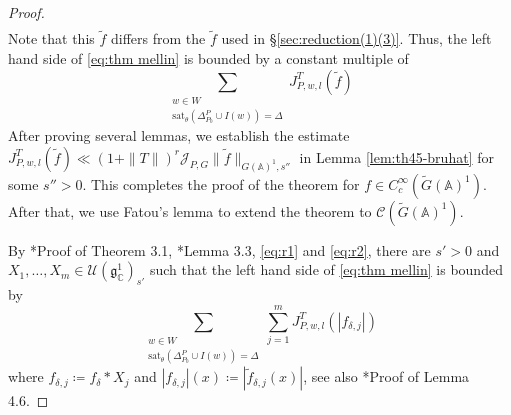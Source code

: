 \documentclass[12pt]{amsart}
\theoremstyle{definition}
\theoremstyle{plain}
\theoremstyle{remark}
\def\C{\mathbb{C}}%
\def\A{\mathbb{A}}%
\def\inf{\infty}
\newcommand{\fg}{\mathfrak{g}}
\newcommand{\cC}{\mathcal{C}}
\newcommand{\cJ}{\mathcal{J}}
\newcommand{\cU}{\mathcal{U}}
\numberwithin{equation}{section}
\newcommand{\tG}{\widetilde{G}}
\newcommand{\tf}{\tilde{f}}
\newcommand{\sat}{\mathrm{sat}}
\begin{document}
\begin{proof}
\begin{align*}
\end{align*}
Note that this $\tf$ differs from the $\tf$ used in \S\ref{sec:reduction(1)(3)}.
Thus, the left hand side of \eqref{eq:thm mellin} is bounded by a constant multiple of
\begin{equation}\label{eq:r3}
\sum_{\substack{w\in W \\ \sat_\theta(\Delta_{P_0}^P\cup I(w))=\Delta }} J_{P,w,l}^{T}(\tf)    
\end{equation}
After proving several lemmas, we establish the estimate $J_{P,w,l}^{T}(\tf) \ll (1+\|T\|)^r \cJ_{P,G} \|\tf\|_{G(\A)^1,s''}$ in Lemma \ref{lem:th45-bruhat} for some $s''>0$. 
This completes the proof of the theorem for $f\in C^\inf_c(\tG(\A)^1)$.
After that, we use Fatou's lemma to extend the theorem to $\cC(\tG(\A)^1)$.




By \cite{FL16}*{Proof of Theorem 3.1}, \cite{FL16}*{Lemma 3.3}, \eqref{eq:r1} and \eqref{eq:r2}, there are $s'>0$ and $X_1,\dots,X_m\in \cU(\fg^1_\C)_{s'}$ such that the left hand side of \eqref{eq:thm mellin} is bounded by
\begin{equation}\label{eq:r3}
\sum_{\substack{w\in W \\ \sat_\theta(\Delta_{P_0}^P\cup I(w))=\Delta }} \sum_{j=1}^m J_{P,w,l}^{T}(|f_{\delta,j}|)    
\end{equation}
where $f_{\delta,j}\coloneqq f_\delta*X_j$ and $|f_{\delta,j}|(x)\coloneqq |\tf_{\delta,j}(x)|$, see also \cite{FM21}*{Proof of Lemma 4.6}. 
\fi






\end{proof}
\end{document}
